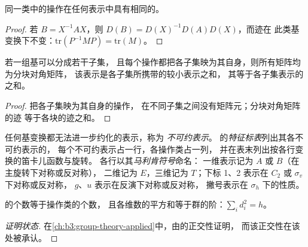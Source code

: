 \begin{proposition}[特征标是类函数]\label{prop:b3:point-groups:class-characters}
同一类中的操作在任何表示中具有相同的。
\end{proposition}

\begin{proof}
若 $B = X^{-1}AX$，则 $D(B) = D(X)^{-1}D(A)D(X)$，而迹在
此类基变换下不变：$\mathrm{tr}(P^{-1}MP) = \mathrm{tr}(M)$。
\end{proof}

\begin{proposition}[按块约化]\label{prop:b3:point-groups:direct-sum}
若一组基可以分成若干子集，
且每个操作都把各子集映为其自身，则所有矩阵均为分块对角矩阵，
该表示是各子集所携带的较小表示之和，
其等于各子集表示的之和。
\end{proposition}

\begin{proof}
把各子集映为其自身的操作，
在不同子集之间没有矩阵元；分块对角矩阵的迹
等于各块的迹之和。
\end{proof}

\begin{definition}\label{def:b3:point-groups:irrep}
任何基变换都无法进一步约化的表示，称为
\emph{不可约表示}。
的\emph{特征标表}列出其各不可约表示的，
每个不可约表示占一行，各操作类占一列，
并在表末列出按各行变换的笛卡儿函数与旋转。
各行以其\emph{马利肯符号}命名：
一维表示记为 $A$ 或 $B$（在主旋转下对称或反对称），
二维记为 $E$，三维记为 $T$；下标 1、2 表示在 $C_2$ 或 $\sigma_v$ 下对称或反对称，
$g$、$u$ 表示在反演下对称或反对称，
撇号表示在 $\sigma_h$ 下的性质。
\end{definition}

\begin{proposition}[特征标表的大小]\label{prop:b3:point-groups:irrep-count}
的个数等于操作类的个数，
且各维数的平方和等于群的阶：$\sum_id_i^2 = h$。
\end{proposition}
\begin{proof}[证明状态]
在\cref{ch:b3:group-theory-applied}中，由的正交性证明，
而该正交性在该处被承认。
\end{proof}

